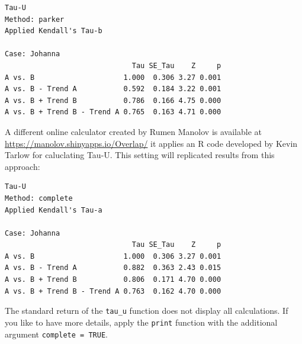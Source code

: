 \documentclass[
  letterpaper,
  DIV=11,
  numbers=noendperiod]{scrreprt}
\newenvironment{Shaded}{\begin{snugshade}}{\end{snugshade}}
\newcommand{\AttributeTok}[1]{\textcolor[rgb]{0.40,0.45,0.13}{#1}}
\newcommand{\ConstantTok}[1]{\textcolor[rgb]{0.56,0.35,0.01}{#1}}
\newcommand{\FunctionTok}[1]{\textcolor[rgb]{0.28,0.35,0.67}{#1}}
\newcommand{\NormalTok}[1]{\textcolor[rgb]{0.00,0.23,0.31}{#1}}
\newcommand{\SpecialCharTok}[1]{\textcolor[rgb]{0.37,0.37,0.37}{#1}}
\newcommand{\StringTok}[1]{\textcolor[rgb]{0.13,0.47,0.30}{#1}}
\begin{document}
\begin{verbatim}
Tau-U
Method: parker 
Applied Kendall's Tau-b

Case: Johanna 
                              Tau SE_Tau    Z     p
A vs. B                     1.000  0.306 3.27 0.001
A vs. B - Trend A           0.592  0.184 3.22 0.001
A vs. B + Trend B           0.786  0.166 4.75 0.000
A vs. B + Trend B - Trend A 0.765  0.163 4.71 0.000
\end{verbatim}

A different online calculator created by Rumen Manolov is available at
\url{https://manolov.shinyapps.io/Overlap/} it applies an R code
developed by Kevin Tarlow for caluclating Tau-U. This setting will
replicated results from this approach:

\begin{Shaded}
\end{Shaded}

\begin{verbatim}
Tau-U
Method: complete 
Applied Kendall's Tau-a

Case: Johanna 
                              Tau SE_Tau    Z     p
A vs. B                     1.000  0.306 3.27 0.001
A vs. B - Trend A           0.882  0.363 2.43 0.015
A vs. B + Trend B           0.806  0.171 4.70 0.000
A vs. B + Trend B - Trend A 0.763  0.162 4.70 0.000
\end{verbatim}

The standard return of the \texttt{tau\_u} function does not display all
calculations. If you like to have more details, apply the \texttt{print}
function with the additional argument \texttt{complete\ =\ TRUE}.

\begin{Shaded}
\end{Shaded}
\end{document}
